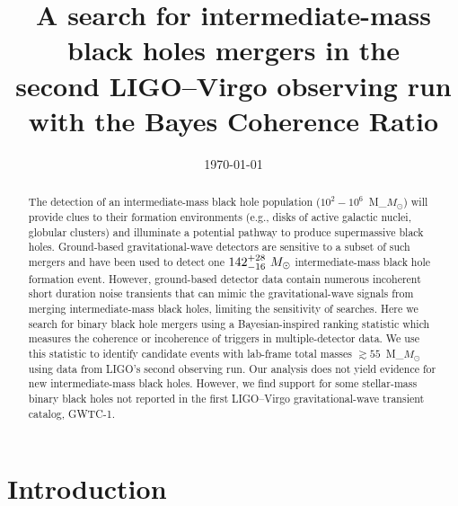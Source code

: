 \documentclass[
 nofootinbib,
 amsmath,amssymb,
 aps,
 twocolumn,
 superscriptaddress
]{revtex4-2}
\newcommand{\mathcmd}[1]{{\sc \relax\ifmmode#1\else $#1$\fi}\xspace}
\newcommand{\msun}{\mathcmd{M_\odot}}
\begin{document}
\title{A search for intermediate-mass black holes mergers in the \\second LIGO--Virgo observing run with the Bayes Coherence Ratio}




\date{\today}


\begin{abstract}
The detection of an intermediate-mass black hole population ($10^2-10^6$~\msun) will provide clues to their formation environments (e.g., disks of active galactic nuclei, globular clusters) and illuminate a potential pathway to produce supermassive black holes. Ground-based gravitational-wave detectors are sensitive to a subset of such mergers and have been used to detect one $142^{+28}_{-16}~\msun$ intermediate-mass black hole formation event. However, ground-based detector data contain numerous incoherent short duration noise transients that can mimic the gravitational-wave signals from merging intermediate-mass black holes, limiting the sensitivity of searches. Here we search for binary black hole mergers using a Bayesian-inspired ranking statistic which measures the coherence or incoherence of triggers in multiple-detector data. We use this statistic to identify candidate events with lab-frame total masses $\gtrsim55$~\msun using data from LIGO's second observing run. Our analysis does not yield evidence for new intermediate-mass black holes. However, we find support for some stellar-mass binary black holes not reported in the first LIGO--Virgo gravitational-wave transient catalog, GWTC-1.
\end{abstract}

\maketitle

\section{Introduction}
\end{document}

